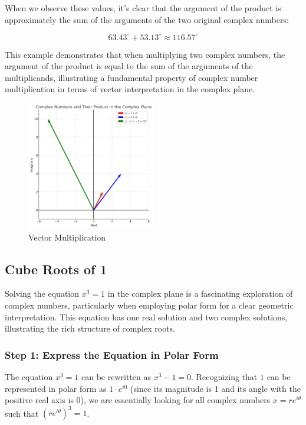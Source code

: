 \documentclass[
]{article}
\begin{document}
When we observe these values, it's clear that the argument of the
product is approximately the sum of the arguments of the two original
complex numbers:

\[63.43^\circ + 53.13^\circ \approx 116.57^\circ\]

This example demonstrates that when multiplying two complex numbers, the
argument of the product is equal to the sum of the arguments of the
multiplicands, illustrating a fundamental property of complex number
multiplication in terms of vector interpretation in the complex plane.

\begin{figure}
\centering
\includegraphics[width=0.5\textwidth,height=\textheight]{vector-mult-1.png}
\caption{Vector Multiplication}
\end{figure}

\subsection{Cube Roots of 1}\label{cube-roots-of-1}

Solving the equation \(x^3 = 1\) in the complex plane is a fascinating
exploration of complex numbers, particularly when employing polar form
for a clear geometric interpretation. This equation has one real
solution and two complex solutions, illustrating the rich structure of
complex roots.

\subsubsection{Step 1: Express the Equation in Polar
Form}\label{step-1-express-the-equation-in-polar-form}

The equation \(x^3 = 1\) can be rewritten as \(x^3 - 1 = 0\).
Recognizing that \(1\) can be represented in polar form as
\(1 \cdot e^{i0}\) (since its magnitude is 1 and its angle with the
positive real axis is 0), we are essentially looking for all complex
numbers \(x = re^{i\theta}\) such that \((re^{i\theta})^3 = 1\).
\end{document}
